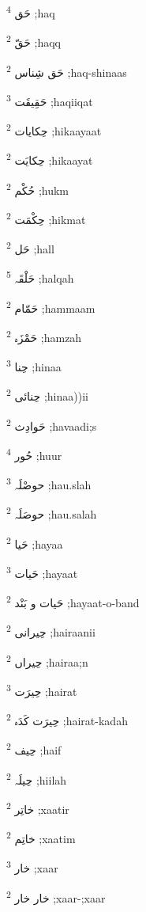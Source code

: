 \documentclass[12pt]{article}
\begin{document}
\begin{multicols}{5}
{\ur حَق}   \textsuperscript{4} ;haq

{\ur حَقّ}   \textsuperscript{2} ;haqq

{\ur حَق شِناس}   \textsuperscript{2} ;haq-shinaas

{\ur حَقِیقَت}   \textsuperscript{3} ;haqiiqat

{\ur حِکایات}   \textsuperscript{2} ;hikaayaat

{\ur حِکایَت}   \textsuperscript{2} ;hikaayat

{\ur حُکْم}   \textsuperscript{2} ;hukm

{\ur حِکْمَت}   \textsuperscript{2} ;hikmat

{\ur حَل}   \textsuperscript{2} ;hall

{\ur حَلْقَہ}   \textsuperscript{5} ;halqah

{\ur حَمّام}   \textsuperscript{2} ;hammaam

{\ur حَمْزَہ}   \textsuperscript{2} ;hamzah

{\ur حِنا}   \textsuperscript{3} ;hinaa

{\ur حِنائی}   \textsuperscript{2} ;hinaa))ii

{\ur حَوادِث}   \textsuperscript{2} ;havaadi;s

{\ur حُور}   \textsuperscript{4} ;huur

{\ur حوصْلَہ}   \textsuperscript{3} ;hau.slah

{\ur حوصَلَہ}   \textsuperscript{2} ;hau.salah

{\ur حَیا}   \textsuperscript{2} ;hayaa

{\ur حَیات}   \textsuperscript{3} ;hayaat

{\ur حَیات و بَنْد}   \textsuperscript{2} ;hayaat-o-band

{\ur حِیرانی}   \textsuperscript{2} ;hairaanii

{\ur حِیراں}   \textsuperscript{2} ;hairaa;n

{\ur حِیرَت}   \textsuperscript{3} ;hairat

{\ur حِیرَت کَدَہ}   \textsuperscript{2} ;hairat-kadah

{\ur حِیف}   \textsuperscript{2} ;haif

{\ur حِیلَہ}   \textsuperscript{2} ;hiilah

{\ur خاتِر}   \textsuperscript{2} ;xaatir

{\ur خاتِم}   \textsuperscript{2} ;xaatim

{\ur خار}   \textsuperscript{3} ;xaar

{\ur خار خار}   \textsuperscript{2} ;xaar-;xaar


\end{multicols}
\end{document}
